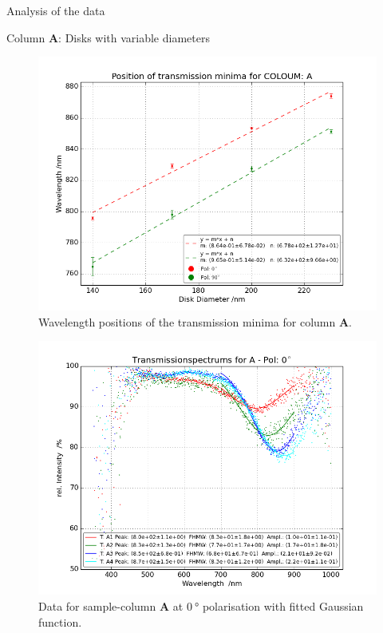 \documentclass[pdftex, a4paper,11pt, twoside, UKenglish]{report}
\begin{document}
\begin{chapter}{Analysis of the data}
\begin{section}{Column \textbf{A}: Disks with variable diameters}
      \begin{figure}[b!]
        \centering
        \includegraphics[width=\textwidth]{Figures/MinimaPosA.png}
        \caption{Wavelength positions of the transmission minima for column
            \textbf{A}.}
        \label{fig:MinimaPosA}
      \end{figure}
      \newpage
      \begin{figure}[ht!]
        \centering
        \begin{minipage}{.95\textwidth}
          \centering
          \includegraphics[width=\textwidth]
              {Figures/TransspecFIT_APol0.png}
          \caption{Data for sample-column \textbf{A} at $\SI{0}{\degree}$
              polarisation with fitted Gaussian function.}

\end{minipage}
\end{figure}
\end{section}
\end{chapter}
\end{document}
